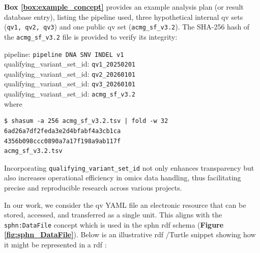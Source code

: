 \textbf{Box \ref{box:example_concept}} provides an example analysis plan (or result database entry), listing the pipeline used, three hypothetical internal \ac{qv} sets (\texttt{qv1, qv2, qv3}) and one public \ac{qv} set (\texttt{acmg\_sf\_v3.2}). The SHA-256 hash of the \texttt{acmg\_sf\_v3.2} file is provided to verify its integrity:
\begin{tcolorbox}[
    colback=white!0,
    colframe=black,
    boxrule=1pt,
    arc=1mm,
    outer arc=1mm,
    title=\textbf{\refstepcounter{myboxcounter}\label{box:example_concept}Box \themyboxcounter: Example implementation of QV Set ID}
]
pipeline: \colorbox{colorSUNSET1!30}{\texttt{pipeline DNA SNV INDEL v1}}\\
qualifying\_variant\_set\_id: \colorbox{colorSUNSET2!60}{\texttt{qv1\_20250201}}\\
qualifying\_variant\_set\_id: \colorbox{colorSUNSET2!60}{\texttt{qv2\_20260101}}\\
qualifying\_variant\_set\_id: \colorbox{colorSUNSET2!60}{\texttt{qv3\_20260101}}\\
qualifying\_variant\_set\_id: \colorbox{colorSUNSET2!60}{\texttt{acmg\_sf\_v3.2}}\\

where 
\begin{verbatim}
$ shasum -a 256 acmg_sf_v3.2.tsv | fold -w 32
6ad26a7df2feda3e2d4bfabf4a3cb1ca
4356b098ccc0890a7a17f198a9ab117f
acmg_sf_v3.2.tsv
\end{verbatim}
\end{tcolorbox}

Incorporating \texttt{qualifying\_variant\_set\_id} not only enhances transparency but also increases operational efficiency in omics data handling, thus facilitating precise and reproducible research across various projects.

In our work, we consider the \ac{qv} YAML file an electronic resource that can be stored, accessed, and transferred as a single unit.
This aligns with the \texttt{sphn:DataFile} concept which is used in the \ac{sphn} \ac{rdf} schema 
(\textbf{Figure \ref{fig:sphn_DataFile}}).
Below is an illustrative \ac{rdf} /Turtle snippet showing how it might be represented in a \ac{rdf} :

